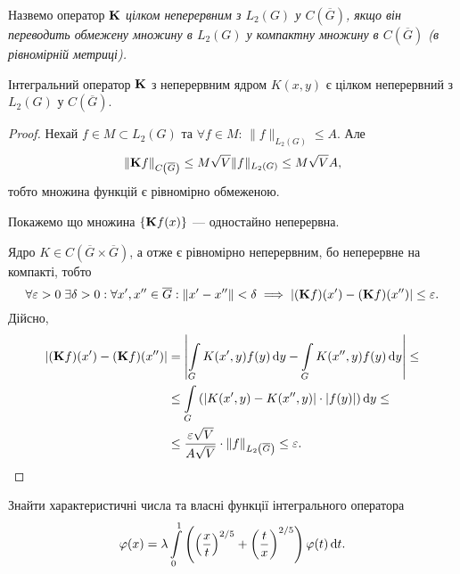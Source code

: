 \begin{definition}
	Назвемо оператор $\bf{K}$ \it{цілком неперервним} з $L_2(G)$ у $C\left(\overline G\right)$, якщо він переводить обмежену множину в $L_2(G)$ у компактну множину в $C\left(\overline G\right)$ (в рівномірній метриці).
\end{definition}

\begin{lemma}
	Інтегральний оператор $\bf{K}$ з неперервним ядром $K(x, y)$ є цілком неперервний з $L_2(G)$ у $C\left(\overline G\right)$.
\end{lemma}

\begin{proof}
	Нехай $f \in M \subset L_2(G)$ та $\forall f \in M$: $\|f\|_{L_2(G)} \le A$. Але 
	\begin{equation}
		\|\bf{K} f\|_{C\left(\overline G\right)} \le M \sqrt{V} \|f\|_{L_2(G)} \le M \sqrt{V} A,	
	\end{equation}
	тобто множина функцій є рівномірно обмеженою. \medskip

	Покажемо що множина $\{ \bf{K}f(x)\}$ --- одностайно неперервна. \medskip

	Ядро $K \in C\left(\overline G \times \overline G\right)$, а отже є рівномірно неперервним, бо неперервне на компакті, тобто
	\begin{equation}
		\forall \epsilon > 0  \-\;\exists \delta > 0: \forall x', x'' \in \overline G: \left\|x' - x''\right\| < \delta \implies \left|(\bf{K}f)(x') - (\bf{K}f)(x'')\right| \le \epsilon.
	\end{equation}
	Дійсно,
	\begin{equation}
		\begin{aligned}
			|(\bf{K}f)(x') - (\bf{K}f)(x'')| &= \left| \Int_G K(x', y) f(y) \diff y - \Int_G K(x'', y) f(y) \diff y \right| \le \\
			&\le \Int_G \left( |K(x', y) - K(x'', y)| \cdot |f(y)| \right) \diff y \le \\
			&\le \dfrac{\epsilon \sqrt{V}}{A \sqrt{V}} \cdot \|f\|_{L_2\left(\overline G\right)} \le \epsilon.
		\end{aligned}
	\end{equation}
\end{proof}

\newpage

\begin{example}
	Знайти характеристичні числа та власні функції інтегрального оператора 
	\begin{equation*}
		\phi(x) = \lambda \Int_0^1 \left( \left( \dfrac{x}{t} \right)^{2/5} + \left( \dfrac{t}{x} \right)^{2/5} \right) \phi(t) \diff t.
	\end{equation*}
\end{example}

